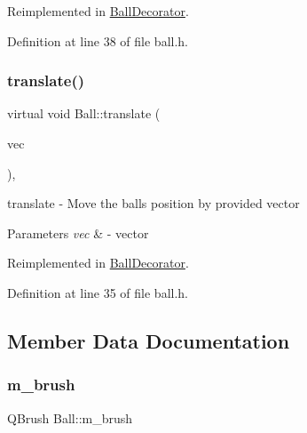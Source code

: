 Reimplemented in \mbox{\hyperlink{class_ball_decorator_aae01d9541d78d1a679ace63127aacd69}{Ball\+Decorator}}.



Definition at line 38 of file ball.\+h.

\mbox{\label{class_ball_a88546ffd1a37b301a5c7085f3eabe8f0}} 
\subsubsection{\texorpdfstring{translate()}{translate()}}
{\footnotesize\ttfamily virtual void Ball\+::translate (\begin{DoxyParamCaption}\item[{Q\+Vector2D}]{vec }\end{DoxyParamCaption})\hspace{0.3cm}{\ttfamily [inline]}, {\ttfamily [virtual]}}



translate -\/ Move the ball\textquotesingle{}s position by provided vector 


\begin{DoxyParams}{Parameters}
{\em vec} & -\/ vector \\
\hline
\end{DoxyParams}


Reimplemented in \mbox{\hyperlink{class_ball_decorator_aae30ba0b71629db797e0ea2639c5e32d}{Ball\+Decorator}}.



Definition at line 35 of file ball.\+h.



\subsection{Member Data Documentation}
\mbox{\label{class_ball_a8eeb4e79fca6415f0bacb80457f4487c}} 
\subsubsection{\texorpdfstring{m\+\_\+brush}{m\_brush}}
{\footnotesize\ttfamily Q\+Brush Ball\+::m\+\_\+brush\hspace{0.3cm}{\ttfamily [protected]}}



